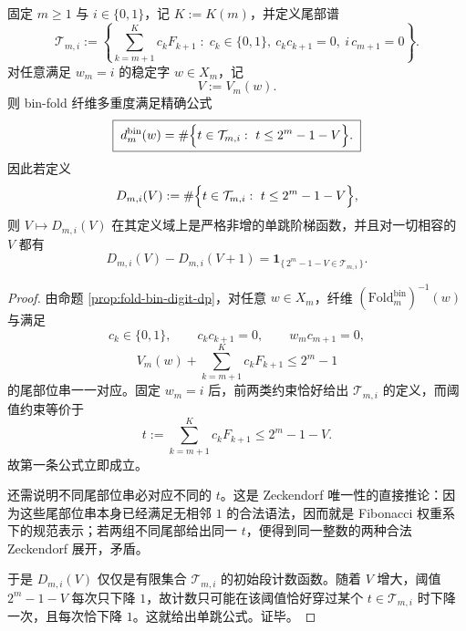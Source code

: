\begin{theorem}\label{thm:xi-foldbin-lastbit-tail-spectrum-single-jump-staircase}
固定 \(m\ge 1\) 与 \(i\in\{0,1\}\)，记 \(K:=K(m)\)，并定义尾部谱
\[
\mathcal T_{m,i}
:=
\left\{
\sum_{k=m+1}^{K}c_kF_{k+1}\;:\;
c_k\in\{0,1\},\ 
c_kc_{k+1}=0,\ 
i\,c_{m+1}=0
\right\}.
\]
对任意满足 \(w_m=i\) 的稳定字 \(w\in X_m\)，记
\[
V:=V_m(w).
\]
则 bin-fold 纤维多重度满足精确公式
\[
\boxed{\;
d_m^{\mathrm{bin}}(w)
=
\#\Bigl\{t\in\mathcal T_{m,i}:\ t\le 2^m-1-V\Bigr\}.\;}
\]
因此若定义
\[
D_{m,i}(V)
:=
\#\Bigl\{t\in\mathcal T_{m,i}:\ t\le 2^m-1-V\Bigr\},
\]
则 \(V\mapsto D_{m,i}(V)\) 在其定义域上是严格非增的单跳阶梯函数，并且对一切相容的 \(V\) 都有
\[
\boxed{\;
D_{m,i}(V)-D_{m,i}(V+1)
=
\mathbf 1_{\{\,2^m-1-V\in\mathcal T_{m,i}\,\}}.\;}
\]
\end{theorem}
\begin{proof}
由命题 \ref{prop:fold-bin-digit-dp}，对任意 \(w\in X_m\)，纤维 \((\mathrm{Fold}^{\mathrm{bin}}_m)^{-1}(w)\) 与满足
\[
c_k\in\{0,1\},\qquad
c_kc_{k+1}=0,\qquad
w_m c_{m+1}=0,
\]
\[
V_m(w)+\sum_{k=m+1}^{K}c_kF_{k+1}\le 2^m-1
\]
的尾部位串一一对应。固定 \(w_m=i\) 后，前两类约束恰好给出 \(\mathcal T_{m,i}\) 的定义，而阈值约束等价于
\[
t:=\sum_{k=m+1}^{K}c_kF_{k+1}\le 2^m-1-V.
\]
故第一条公式立即成立。

还需说明不同尾部位串必对应不同的 \(t\)。这是 Zeckendorf 唯一性的直接推论：因为这些尾部位串本身已经满足无相邻 \(1\) 的合法语法，因而就是 Fibonacci 权重系下的规范表示；若两组不同尾部给出同一 \(t\)，便得到同一整数的两种合法 Zeckendorf 展开，矛盾。

于是 \(D_{m,i}(V)\) 仅仅是有限集合 \(\mathcal T_{m,i}\) 的初始段计数函数。随着 \(V\) 增大，阈值 \(2^m-1-V\) 每次只下降 \(1\)，故计数只可能在该阈值恰好穿过某个 \(t\in\mathcal T_{m,i}\) 时下降一次，且每次恰下降 \(1\)。这就给出单跳公式。证毕。
\end{proof}


